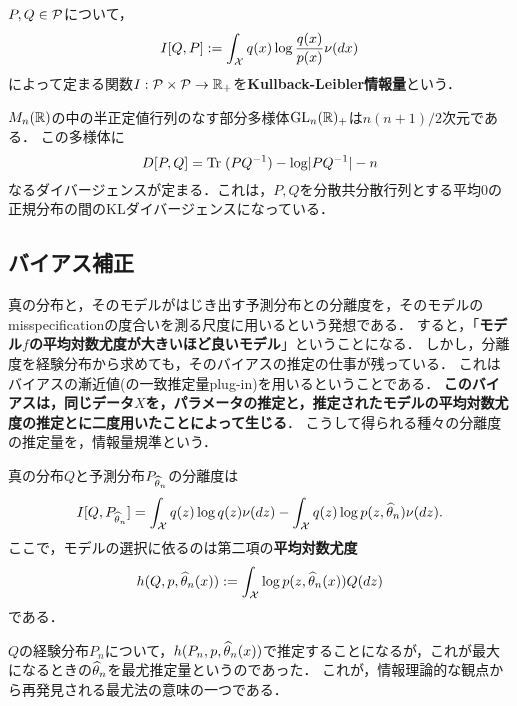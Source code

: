 \documentclass[uplatex,dvipdfmx]{jsreport}
\begin{document}
\begin{definition}
    $P,Q\in\P$について，
    \[I[Q,P]:=\int_\X q(x)\log\frac{q(x)}{p(x)}\nu(dx)\]
    によって定まる関数$I:\P\times\P\to\R_+$を\textbf{Kullback-Leibler情報量}という．
\end{definition}

\begin{example}[正規分布族のKL分離度]
    $M_n(\R)$の中の半正定値行列のなす部分多様体$\GL_n(\R)_+$は$n(n+1)/2$次元である．
    この多様体に
    \[D[P,Q]=\Tr(PQ^{-1})-\log\abs{PQ^{-1}}-n\]
    なるダイバージェンスが定まる．これは，$P,Q$を分散共分散行列とする平均$0$の正規分布の間のKLダイバージェンスになっている．
\end{example}

\subsection{バイアス補正}

\begin{tcolorbox}[colframe=ForestGreen, colback=ForestGreen!10!white,breakable,colbacktitle=ForestGreen!40!white,coltitle=black,fonttitle=\bfseries\sffamily,
title=]
    真の分布と，そのモデルがはじき出す予測分布との分離度を，そのモデルのmisspecificationの度合いを測る尺度に用いるという発想である．
    すると，「\textbf{モデル$f$の平均対数尤度が大きいほど良いモデル}」ということになる．
    しかし，分離度を経験分布から求めても，そのバイアスの推定の仕事が残っている．
    これはバイアスの漸近値(の一致推定量plug-in)を用いるということである．
    \textbf{このバイアスは，同じデータ$X$を，パラメータの推定と，推定されたモデルの平均対数尤度の推定とに二度用いたことによって生じる}．
    こうして得られる種々の分離度の推定量を，情報量規準という．
\end{tcolorbox}

\begin{discussion}[KL情報量の最小化と平均対数尤度の最大化は同値]
    真の分布$Q$と予測分布$P_{\wh{\theta}_n}$の分離度は
    \[I[Q,P_{\wh{\theta}_n}]=\int_\X q(z)\log q(z)\nu(dz)-\int_\X q(z)\log p(z,\wh{\theta}_n)\nu(dz).\]
    ここで，モデルの選択に依るのは第二項の\textbf{平均対数尤度}
    \[h(Q,p,\wh{\theta}_n(x)):=\int_\X\log p(z,\wh{\theta}_n(x))Q(dz)\]
    である．
\end{discussion}
\begin{remarks}
    $Q$の経験分布$P_n$について，$h(P_n,p,\wh{\theta}_n(x))$で推定することになるが，これが最大になるときの$\wh{\theta}_n$を最尤推定量というのであった．
    これが，情報理論的な観点から再発見される最尤法の意味の一つである．
\end{remarks}
\end{document}
